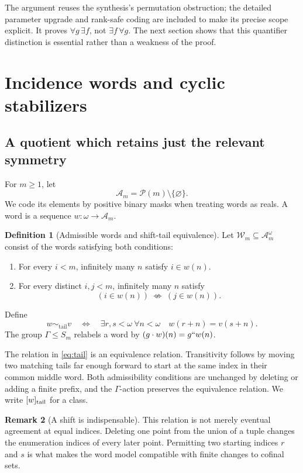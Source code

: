 \documentclass[11pt,letterpaper]{article}
\theoremstyle{definition}
\newtheorem{definition}{Definition}[section]
\newtheorem{remark}[definition]{Remark}
\numberwithin{equation}{section}
\newcommand{\Pow}{\mathcal P}
\newcommand{\Tail}{\mathrel{\sim_{\mathrm{tail}}}}
\newcommand{\W}{\mathcal W}
\begin{document}
The argument reuses the synthesis's permutation obstruction; the detailed parameter upgrade and rank-safe coding are included to make its precise scope explicit. It proves $\forall g\,\exists f$, not $\exists f\,\forall g$. The next section shows that this quantifier distinction is essential rather than a weakness of the proof.

\section{Incidence words and cyclic stabilizers}\label{sec:words}

\subsection{A quotient which retains just the relevant symmetry}

For $m\ge1$, let
\[
 \mathcal A_m=\Pow(m)\setminus\{\varnothing\}.
\]
We code its elements by positive binary masks when treating words as reals. A word is a sequence $w:\omega\to\mathcal A_m$.

\begin{definition}[Admissible words and shift-tail equivalence]\label{def:words}
Let $\W_m\subseteq\mathcal A_m^\omega$ consist of the words satisfying both conditions:
\begin{enumerate}
\item For every $i<m$, infinitely many $n$ satisfy $i\in w(n)$.
\item For every distinct $i,j<m$, infinitely many $n$ satisfy
\[
       (i\in w(n))\ \not\Longleftrightarrow\ (j\in w(n)).
\]
\end{enumerate}
Define
\begin{equation}\label{eq:tail}
 w\Tail v\quad\Longleftrightarrow\quad
 \exists r,s<\omega\ \forall n<\omega\quad w(r+n)=v(s+n).
\end{equation}
The group $\Gamma\le S_m$ relabels a word by $(g\cdot w)(n)=g``w(n)$.
\end{definition}

The relation in \eqref{eq:tail} is an equivalence relation. Transitivity follows by moving two matching tails far enough forward to start at the same index in their common middle word. Both admissibility conditions are unchanged by deleting or adding a finite prefix, and the $\Gamma$-action preserves the equivalence relation. We write $[w]_{\rm tail}$ for a class.

\begin{remark}[A shift is indispensable]
This relation is not merely eventual agreement at equal indices. Deleting one point from the union of a tuple changes the enumeration indices of every later point. Permitting two starting indices $r$ and $s$ is what makes the word model compatible with finite changes to cofinal sets.
\end{remark}
\end{document}
